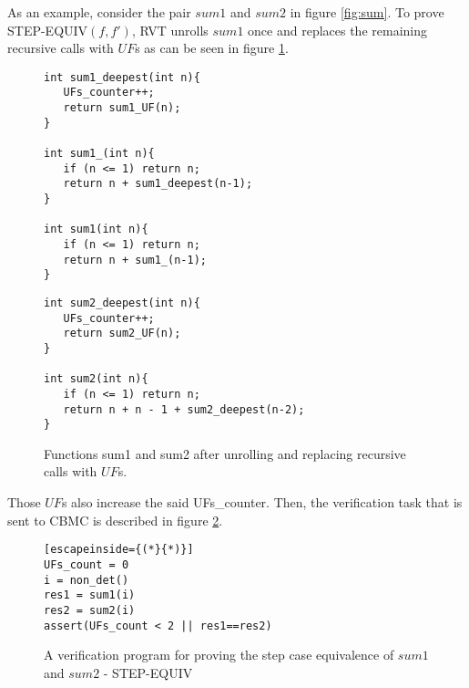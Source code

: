 As an example, consider the pair $sum1$ and $sum2$ in figure \ref{fig:sum}. To prove STEP-EQUIV$(f,f')$, RVT unrolls $sum1$ once and replaces the remaining recursive calls with $UF$s as can be seen in figure \ref{fig:sumUnrolled}.
\begin{figure}[h]
\begin{center}
\begin{minipage}{7 cm}
\begin{lstlisting}
int sum1_deepest(int n){
   UFs_counter++;
   return sum1_UF(n);
}

int sum1_(int n){
   if (n <= 1) return n;
   return n + sum1_deepest(n-1);
}

int sum1(int n){
   if (n <= 1) return n;
   return n + sum1_(n-1);
}
\end{lstlisting}
\end{minipage}
\begin{minipage}{7 cm}
\begin{lstlisting}
int sum2_deepest(int n){
   UFs_counter++;
   return sum2_UF(n);
}

int sum2(int n){
   if (n <= 1) return n;
   return n + n - 1 + sum2_deepest(n-2);
}
\end{lstlisting}
\end{minipage}
\caption{Functions sum1 and sum2 after unrolling and replacing recursive calls with $UF$s.}
\label{fig:sumUnrolled}
\end{center}
\end{figure} 
Those $UF$s also increase the said UFs\_counter. Then, the verification task that is sent to CBMC is described in figure \ref{fig:rvtstepcase}.

\begin{figure} [h]
\begin{center}
\begin{minipage}{7 cm}
\begin{lstlisting}[escapeinside={(*}{*)}]
UFs_count = 0
i = non_det()
res1 = sum1(i)
res2 = sum2(i)
assert(UFs_count < 2 || res1==res2)
\end{lstlisting}
\end{minipage}
\caption{A verification program for proving the step case equivalence of $sum1$ and $sum2$ - STEP-EQUIV}
\label{fig:rvtstepcase}
\end{center}
\end{figure}


